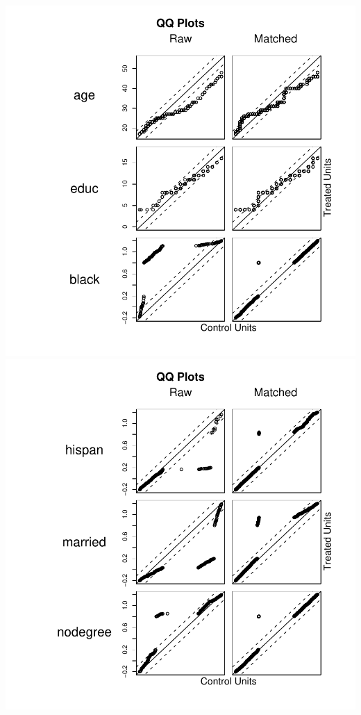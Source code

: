 \documentclass[oneside,letterpaper,titlepage]{article}
\begin{document}
\includegraphics[scale=0.5]{figs/full1}
\includegraphics[scale=0.5]{figs/full2}
\end{document}
